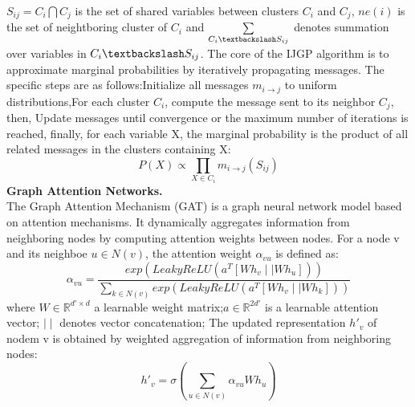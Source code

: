 \(S_{ij}=C_i\bigcap C_j\) is the set of shared variables between clusters \(C_i\) and \(C_j\),  \(ne(i)\) is the set of neightboring cluster of \(C_i\) and \(\sum\limits_{C_i\textbackslash S_{ij}}\) denotes summation over variables in \(C_i\textbackslash S_{ij}\).
The core of the IJGP algorithm is to approximate marginal probabilities by iteratively propagating messages. The specific steps are as follows:Initialize all messages \(m_{i\rightarrow j}\) to uniform distributions,For each cluster \(C_i\), compute the message sent to its neighbor \(C_j\), then, Update messages until convergence or the maximum number of iterations is reached, finally, for each variable X, the marginal probability is the product of all related messages in the clusters containing X:
\begin{equation}
P(X)\propto\prod\limits_{X\in C_i}m_{i\rightarrow j}(S_{ij})
\end{equation}
\textbf{Graph Attention Networks.}\\
The Graph Attention Mechanism (GAT) is a graph neural network model based on attention mechanisms. It dynamically aggregates information from neighboring nodes by computing attention weights between nodes.
For a node v and its neighboe \(u \in N(v)\), the attention weight \(\alpha_{vu}\) is defined as:
\begin{equation}
\alpha_{vu}=\frac{exp(LeakyReLU(a^T[Wh_v\mid\mid Wh_u]))}{\sum\limits_{k\in N(v)}exp(LeakyReLU(a^T[Wh_v\mid\mid Wh_k]))}
\end{equation}
where \(W\in \mathbb{R}^{d'\times d}\) a learnable weight matrix;\(a\in \mathbb{R}^{2d'}\) is a learnable attention vector; \(\mid\mid\) denotes vector concatenation; 
The updated representation \(h'_v\) of nodem v is obtained by weighted aggregation of information from neighboring nodes:
\begin{equation}
h'_v=\sigma(\sum\limits_{u\in N(v)}\alpha_{vu} Wh_u)
\end{equation}

